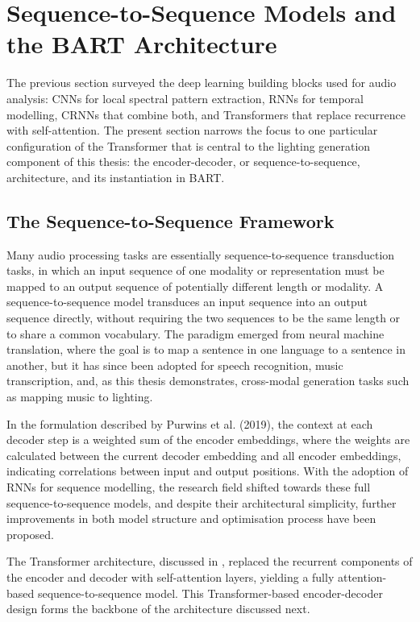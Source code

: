 \section{Sequence-to-Sequence Models and the BART Architecture}
\label{sec:ch2-seq2seq-bart}

The previous section surveyed the deep learning building blocks used for audio analysis: CNNs for local spectral pattern extraction, RNNs for temporal modelling, CRNNs that combine both, and Transformers that replace recurrence with self-attention. The present section narrows the focus to one particular configuration of the Transformer that is central to the lighting generation component of this thesis: the encoder-decoder, or sequence-to-sequence, architecture, and its instantiation in BART.

\subsection{The Sequence-to-Sequence Framework}

Many audio processing tasks are essentially sequence-to-sequence transduction tasks, in which an input sequence of one modality or representation must be mapped to an output sequence of potentially different length or modality. A sequence-to-sequence model transduces an input sequence into an output sequence directly, without requiring the two sequences to be the same length or to share a common vocabulary. The paradigm emerged from neural machine translation, where the goal is to map a sentence in one language to a sentence in another, but it has since been adopted for speech recognition, music transcription, and, as this thesis demonstrates, cross-modal generation tasks such as mapping music to lighting.

In the formulation described by Purwins et al. (2019), the context at each decoder step is a weighted sum of the encoder embeddings, where the weights are calculated between the current decoder embedding and all encoder embeddings, indicating correlations between input and output positions.\cite{hendrikpurwins20191}  With the adoption of RNNs for sequence modelling, the research field shifted towards these full sequence-to-sequence models, and despite their architectural simplicity, further improvements in both model structure and optimisation process have been proposed.\cite{hendrikpurwins20191} 

The Transformer architecture, discussed in , replaced the recurrent components of the encoder and decoder with self-attention layers, yielding a fully attention-based sequence-to-sequence model. This Transformer-based encoder-decoder design forms the backbone of the architecture discussed next.

